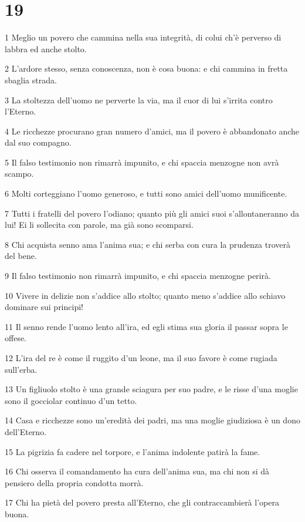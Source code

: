 \chapter{19}

\par 1 Meglio un povero che cammina nella sua integrità, di colui ch'è perverso di labbra ed anche stolto.
\par 2 L'ardore stesso, senza conoscenza, non è cosa buona: e chi cammina in fretta sbaglia strada.
\par 3 La stoltezza dell'uomo ne perverte la via, ma il cuor di lui s'irrita contro l'Eterno.
\par 4 Le ricchezze procurano gran numero d'amici, ma il povero è abbandonato anche dal suo compagno.
\par 5 Il falso testimonio non rimarrà impunito, e chi spaccia menzogne non avrà scampo.
\par 6 Molti corteggiano l'uomo generoso, e tutti sono amici dell'uomo munificente.
\par 7 Tutti i fratelli del povero l'odiano; quanto più gli amici suoi s'allontaneranno da lui! Ei li sollecita con parole, ma già sono scomparsi.
\par 8 Chi acquista senno ama l'anima sua; e chi serba con cura la prudenza troverà del bene.
\par 9 Il falso testimonio non rimarrà impunito, e chi spaccia menzogne perirà.
\par 10 Vivere in delizie non s'addice allo stolto; quanto meno s'addice allo schiavo dominare sui principi!
\par 11 Il senno rende l'uomo lento all'ira, ed egli stima sua gloria il passar sopra le offese.
\par 12 L'ira del re è come il ruggito d'un leone, ma il suo favore è come rugiada sull'erba.
\par 13 Un figliuolo stolto è una grande sciagura per suo padre, e le risse d'una moglie sono il gocciolar continuo d'un tetto.
\par 14 Casa e ricchezze sono un'eredità dei padri, ma una moglie giudiziosa è un dono dell'Eterno.
\par 15 La pigrizia fa cadere nel torpore, e l'anima indolente patirà la fame.
\par 16 Chi osserva il comandamento ha cura dell'anima sua, ma chi non si dà pensiero della propria condotta morrà.
\par 17 Chi ha pietà del povero presta all'Eterno, che gli contraccambierà l'opera buona.
